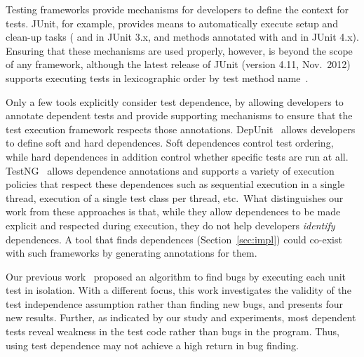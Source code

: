 Testing frameworks provide mechanisms
for developers to define the context for tests.
JUnit, for example, provides means to
automatically execute setup and clean-up tasks
( and  in JUnit
3.x, and methods annotated with  and  in
JUnit 4.x). Ensuring that these mechanisms are used properly, however, is
beyond the scope of any framework, although the latest release of JUnit
(version 4.11, Nov.~2012)
supports executing tests in lexicographic order by test method name~\cite{junitordering}.


Only a few tools explicitly consider test dependence, by
allowing developers to annotate dependent tests and
provide supporting mechanisms to ensure that the test execution framework
respects those annotations.  DepUnit~\cite{depunit}
allows developers to define soft and hard dependences. Soft dependences control
test ordering, while hard dependences in addition control whether specific tests are
run at all.  TestNG~\cite{testng} 
allows dependence annotations and supports a variety of execution policies
that respect these dependences
such as sequential execution
in a single thread, execution of a single test class per thread, etc.\
What distinguishes our work from these approaches is that, while they allow dependences
to be made explicit and respected during execution, they do not help developers
\emph{identify} dependences.  A tool that finds dependences
(Section~\ref{sec:impl}) could co-exist
with such frameworks by generating annotations for them.

Our previous work~\cite{DBLP:conf/sigsoft/MusluSW11} proposed
an algorithm to find bugs by executing each unit
test in isolation. With a different focus,
this work investigates the validity of the test independence assumption
rather than finding new bugs,
and presents four new results.
Further, as indicated by our study and experiments, most dependent
tests reveal weakness in the test code rather than bugs in the program. Thus,
using test dependence may not achieve a high return in bug finding.

